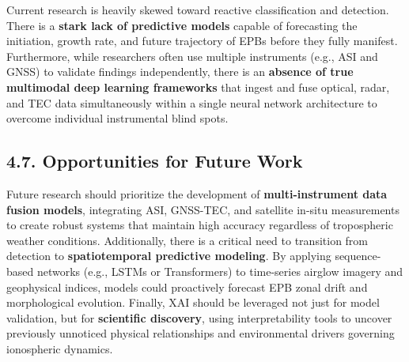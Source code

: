 Current research is heavily skewed toward reactive classification and
detection. There is a \textbf{stark lack of predictive models} capable
of forecasting the initiation, growth rate, and future trajectory of
EPBs before they fully manifest. Furthermore, while researchers often
use multiple instruments (e.g., ASI and GNSS) to validate findings
independently, there is an \textbf{absence of true multimodal deep
learning frameworks} that ingest and fuse optical, radar, and TEC data
simultaneously within a single neural network architecture to overcome
individual instrumental blind spots.

\hypertarget{opportunities-for-future-work}{%
\subsection{4.7. Opportunities for Future
Work}\label{opportunities-for-future-work}}

Future research should prioritize the development of
\textbf{multi-instrument data fusion models}, integrating ASI, GNSS-TEC,
and satellite in-situ measurements to create robust systems that
maintain high accuracy regardless of tropospheric weather conditions.
Additionally, there is a critical need to transition from detection to
\textbf{spatiotemporal predictive modeling}. By applying sequence-based
networks (e.g., LSTMs or Transformers) to time-series airglow imagery
and geophysical indices, models could proactively forecast EPB zonal
drift and morphological evolution. Finally, XAI should be leveraged not
just for model validation, but for \textbf{scientific discovery}, using
interpretability tools to uncover previously unnoticed physical
relationships and environmental drivers governing ionospheric dynamics.
